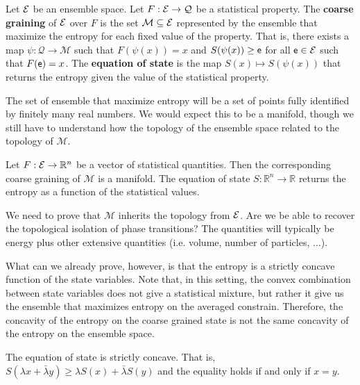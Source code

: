\begin{defn}
	Let $\mathcal{E}$ be an ensemble space. Let $F : \mathcal{E} \to \mathcal{Q}$ be a statistical property. The \textbf{coarse graining} of $\mathcal{E}$ over $F$ is the set $\mathcal{M} \subseteq \mathcal{E}$ represented by the ensemble that maximize the entropy for each fixed value of the property. That is, there exists a map $\psi : \mathcal{Q} \to \mathcal{M}$ such that $F(\psi(x)) = x$ and $S(\psi(x)) \geq \mathsf{e}$ for all $\mathsf{e} \in \mathcal{E}$ such that $F(\mathsf{e}) = x$. The \textbf{equation of state} is the map $S(x) \mapsto S(\psi(x))$ that returns the entropy given the value of the statistical property.
\end{defn}

The set of ensemble that maximize entropy will be a set of points fully identified by finitely many real numbers. We would expect this to be a manifold, though we still have to understand how the topology of the ensemble space related to the topology of $\mathcal{M}$.

\begin{conj}
	Let $F : \mathcal{E} \to \mathbb{R}^n$ be a vector of statistical quantities. Then the corresponding coarse graining of $\mathcal{M}$ is a manifold. The equation of state $S : \mathbb{R}^n \to \mathbb{R}$ returns the entropy as a function of the statistical values.
\end{conj}

\begin{remark}
	We need to prove that $\mathcal{M}$ inherits the topology from $\mathcal{E}$. Are we be able to recover the topological isolation of phase transitions? The quantities will typically be energy plus other extensive quantities (i.e. volume, number of particles, ...).
\end{remark}

What can we already prove, however, is that the entropy is a strictly concave function of the state variables. Note that, in this setting, the convex combination between state variables does not give a statistical mixture, but rather it give us the ensemble that maximizes entropy on the averaged constrain. Therefore, the concavity of the entropy on the coarse grained state is not the same concavity of the entropy on the ensemble space.

\begin{prop}
	The equation of state is strictly concave. That is, $S(\lambda x + \bar{\lambda} y) \geq \lambda S(x) + \bar{\lambda} S(y)$ and the equality holds if and only if $x=y$.
\end{prop}

